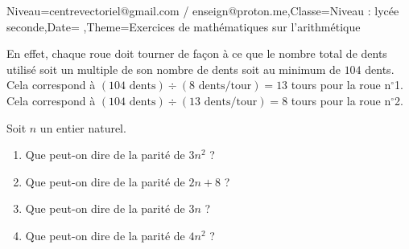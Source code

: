 \documentclass[a4paper,11pt,fleqn]{article}
\begin{document}
\begin{Maquette}[Fiche]{Niveau=centrevectoriel@gmail.com / enseign@proton.me,Classe=Niveau :  lycée seconde,Date=   ,Theme=Exercices de mathématiques  sur l'arithmétique }
\begin{Solution}
\begin{enumerate}[itemsep=1em]
            En effet, chaque roue doit tourner de façon à ce que le nombre total de dents utilisé soit un multiple de son nombre
            de dents soit au minimum de $104$ dents.\\ Cela correspond à $(104\text{ dents})\div (8\text{ dents/tour}) = 13$ tours pour la roue n$^\circ$1.\\Cela correspond à $(104\text{ dents})\div (13\text{ dents/tour}) = 8$ tours pour la roue n$^\circ$2.
\end{enumerate}
\end{Solution}

\begin{exercice}

Soit $n$ un entier naturel.\begin{multicols}{2}
\begin{enumerate}[itemsep=1em]
	\item \begin{minipage}[t]{\linewidth} Que peut-on dire de la parité de $3n^{2}$ ? \end{minipage}
	\item \begin{minipage}[t]{\linewidth} Que peut-on dire de la parité de $2n+8$ ? \end{minipage}
	\item \begin{minipage}[t]{\linewidth} Que peut-on dire de la parité de 3$n$ ? \end{minipage}
	\item \begin{minipage}[t]{\linewidth} Que peut-on dire de la parité de $4n^{2}$ ? \end{minipage}
\end{enumerate}
\end{multicols}
\end{exercice}


\end{Maquette}
\end{document}
